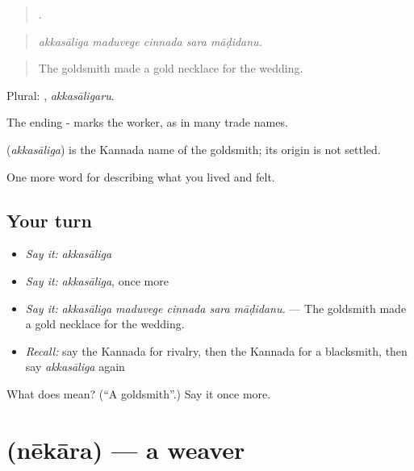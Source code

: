\begin{quote}
    .
\end{quote}

\begin{quote}
\emph{akkasāliga maduvege cinnada sara māḍidanu.}
\end{quote}

\begin{quote}
The goldsmith made a gold necklace for the wedding.
\end{quote}

Plural: , \emph{akkasāligaru}.

The ending - marks the worker, as in many trade names.

\begin{cousinweb}
\textbf{} (\emph{akkasāliga}) is the Kannada name of the goldsmith; its origin is not settled.
\end{cousinweb}

\begin{grammarlens}[title={What you've built}]
One more word for describing what you lived and felt.
\end{grammarlens}

\subsection*{Your turn}
\begin{itemize}
\raggedright
  \item \emph{Say it:} \emph{akkasāliga}
  \item \emph{Say it:} \emph{akkasāliga}, once more
  \item \emph{Say it:} \emph{akkasāliga maduvege cinnada sara māḍidanu.} — The goldsmith made a gold necklace for the wedding.
  \item \emph{Recall:} say the Kannada for rivalry, then the Kannada for a blacksmith, then say \emph{akkasāliga} again
\end{itemize}

\begin{tcolorbox}[breakable,colback=teal!4,colframe=teal!35!black,title={Before you move on}]
What does  mean? (\textquotedblleft{}A goldsmith\textquotedblright{}.) Say it once more.
\end{tcolorbox}
\section[\texorpdfstring{\kn{ನೇಕಾರ} (nēkāra)}{ನೇಕಾರ (nēkāra)}]{ (nēkāra) — a weaver}

